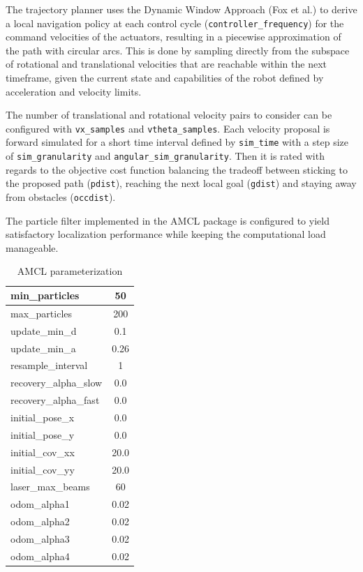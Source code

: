 \documentclass[10pt,journal,compsoc]{IEEEtran}
\begin{document}
The trajectory planner uses the Dynamic Window Approach (Fox et al.\cite{Fox-1997-16403}) to derive a local navigation policy at each control cycle (\texttt{controller\_frequency}) for the command velocities of the actuators, resulting in a piecewise approximation of the path with circular arcs.
This is done by sampling directly from the subspace of rotational and translational velocities that are reachable within the next timeframe, given the current state and capabilities of the robot defined by acceleration and velocity limits.

The number of translational and rotational velocity pairs to consider can be configured with \texttt{vx\_samples} and \texttt{vtheta\_samples}. Each velocity proposal is forward simulated for a short time interval defined by \texttt{sim\_time} with a step size of \texttt{sim\_granularity} and \texttt{angular\_sim\_granularity}.
Then it is rated with regards to the objective cost function balancing the tradeoff between sticking to the proposed path (\texttt{pdist}), reaching the next local goal (\texttt{gdist}) and staying away from obstacles (\texttt{occdist}).


The particle filter implemented in the AMCL package is configured to yield satisfactory localization performance while keeping the computational load manageable.

\begin{table}[h]
      \caption{AMCL parameterization}
      \label{tab:amcl_parameterization}
      \begin{center}
            \begin{tabular}{|l|c|}  \hline
min\_particles & 50 \\ \hline
max\_particles & 200 \\ \hline
update\_min\_d & 0.1 \\ \hline
update\_min\_a & 0.26 \\ \hline
resample\_interval & 1 \\ \hline
recovery\_alpha\_slow & 0.0 \\ \hline
recovery\_alpha\_fast & 0.0 \\ \hline

initial\_pose\_x & 0.0  \\ \hline
initial\_pose\_y & 0.0  \\ \hline
initial\_cov\_xx & 20.0  \\ \hline
initial\_cov\_yy & 20.0  \\ \hline

laser\_max\_beams & 60 \\ \hline
odom\_alpha1 & 0.02 \\ \hline
odom\_alpha2 & 0.02 \\ \hline
odom\_alpha3 & 0.02 \\ \hline
odom\_alpha4 & 0.02 \\ \hline
\end{tabular}
\end{center}
\end{table}                  
\end{document}
